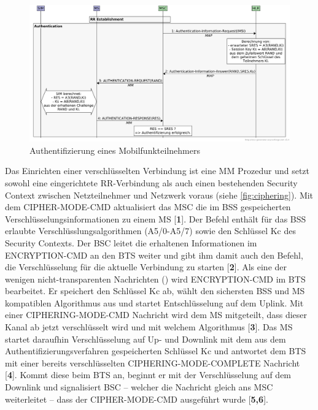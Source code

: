 \begin{figure}[H]
  \begin{center}
    \includegraphics[width=1.00\textwidth]{figures/gsm_authentication.pdf}
  \end{center}
  \caption[Authentifizierung eines Mobilfunkteilnehmers]{Authentifizierung eines Mobilfunkteilnehmers} \label{fig:authentication}
\end{figure}

Das Einrichten einer verschlüsselten Verbindung ist eine \ac{MM} Prozedur und setzt sowohl eine eingerichtete \ac{RR}-Verbindung als auch einen bestehenden Security Context zwischen Netzteilnehmer und Netzwerk voraus (siehe \autoref{fig:ciphering}). Mit dem CIPHER-MODE-CMD aktualisiert das \ac{MSC} die im \ac{BSS} gespeicherten Verschlüsselungsinformationen zu einem \ac{MS} [\textbf{1}]. Der Befehl enthält für das \ac{BSS} erlaubte Verschlüsslungsalgorithmen (A5/0-A5/7) sowie den Schlüssel \ac{Kc} des Security Contexts.  
 Der \ac{BSC} leitet die erhaltenen Informationen im ENCRYPTION-CMD an den \ac{BTS} weiter und gibt ihm damit auch den Befehl, die Verschlüsselung für die aktuelle Verbindung zu starten [\textbf{2}].  Als eine der wenigen nicht-transparenten Nachrichten () wird ENCRYPTION-CMD im \ac{BTS} bearbeitet. Er speichert den Schlüssel \ac{Kc} ab, wählt den sichersten \ac{BSS} und \ac{MS} kompatiblen Algorithmus aus und startet Entschlüsselung auf dem Uplink. Mit einer CIPHERING-MODE-CMD Nachricht wird dem \ac{MS} mitgeteilt, dass dieser Kanal ab jetzt verschlüsselt wird und mit welchem Algorithmus [\textbf{3}].  Das \ac{MS} startet daraufhin Verschlüsselung auf Up- und Downlink mit dem aus dem Authentifizierungsverfahren gespeicherten Schlüssel \ac{Kc} und antwortet dem \ac{BTS} mit einer bereits verschlüsselten CIPHERING-MODE-COMPLETE Nachricht [\textbf{4}]. Kommt diese beim \ac{BTS} an, beginnt er mit der Verschlüsselung auf dem Downlink und signalisiert \ac{BSC} -- welcher die Nachricht gleich ans \ac{MSC} weiterleitet -- dass der CIPHER-MODE-CMD ausgeführt wurde [\textbf{5,6}].

